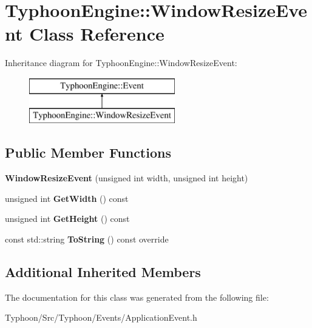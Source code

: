 \hypertarget{class_typhoon_engine_1_1_window_resize_event}{}\section{Typhoon\+Engine\+::Window\+Resize\+Event Class Reference}
\label{class_typhoon_engine_1_1_window_resize_event}
Inheritance diagram for Typhoon\+Engine\+::Window\+Resize\+Event\+:\begin{figure}[H]
\begin{center}
\leavevmode
\includegraphics[height=2.000000cm]{class_typhoon_engine_1_1_window_resize_event}
\end{center}
\end{figure}
\subsection*{Public Member Functions}
\begin{DoxyCompactItemize}
\item 
\mbox{\label{class_typhoon_engine_1_1_window_resize_event_ad62055af3397e84e9700730138852611}} 
{\bfseries Window\+Resize\+Event} (unsigned int width, unsigned int height)
\item 
\mbox{\label{class_typhoon_engine_1_1_window_resize_event_a7d69a203971a1369340d8ff093743c5f}} 
unsigned int {\bfseries Get\+Width} () const
\item 
\mbox{\label{class_typhoon_engine_1_1_window_resize_event_aa5a0dc803a5086ef8d816dc0bacac7ab}} 
unsigned int {\bfseries Get\+Height} () const
\item 
\mbox{\label{class_typhoon_engine_1_1_window_resize_event_aefd901830ac77c2fee5d063254363092}} 
const std\+::string {\bfseries To\+String} () const override
\end{DoxyCompactItemize}
\subsection*{Additional Inherited Members}


The documentation for this class was generated from the following file\+:\begin{DoxyCompactItemize}
\item 
Typhoon/\+Src/\+Typhoon/\+Events/Application\+Event.\+h\end{DoxyCompactItemize}
